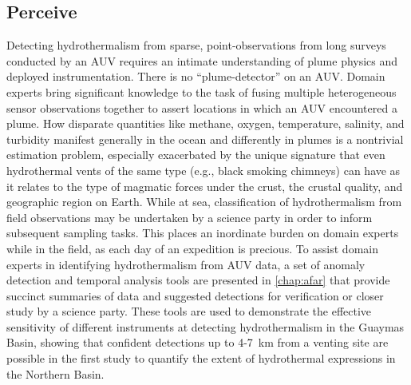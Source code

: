 \subsection{Perceive}
Detecting hydrothermalism from sparse, point-observations from long surveys conducted by an AUV requires an intimate understanding of plume physics and deployed instrumentation.
There is no ``plume-detector'' on an AUV.
Domain experts bring significant knowledge to the task of fusing multiple heterogeneous sensor observations together to assert locations in which an AUV encountered a plume.
How disparate quantities like methane, oxygen, temperature, salinity, and turbidity manifest generally in the ocean and differently in plumes is a nontrivial estimation problem, especially exacerbated by the unique signature that even hydrothermal vents of the same type (e.g., black smoking chimneys) can have as it relates to the type of magmatic forces under the crust, the crustal quality, and geographic region on Earth.
While at sea, classification of hydrothermalism from field observations may be undertaken by a science party in order to inform subsequent sampling tasks. 
This places an inordinate burden on domain experts while in the field, as each day of an expedition is precious. 
To assist domain experts in identifying hydrothermalism from AUV data, a set of anomaly detection and temporal analysis tools are presented in \cref{chap:afar} that provide succinct summaries of data and suggested detections for verification or closer study by a science party.
These tools are used to demonstrate the effective sensitivity of different instruments at detecting hydrothermalism in the Guaymas Basin, showing that confident detections up to 4-\SI{7}{\kilo\meter} from a venting site are possible in the first study to quantify the extent of hydrothermal expressions in the Northern Basin.


